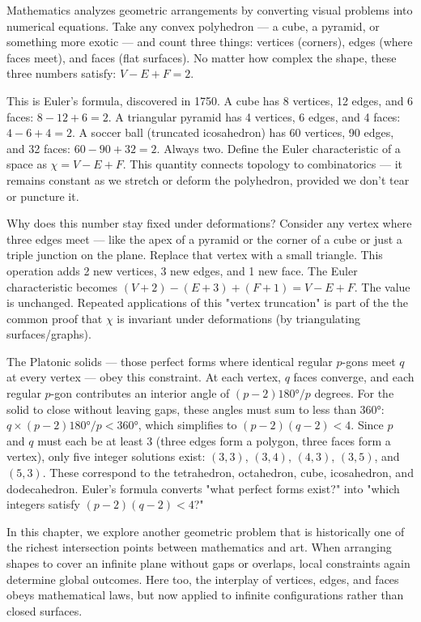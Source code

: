 Mathematics analyzes geometric arrangements by converting visual problems into numerical equations. Take any convex polyhedron — a cube, a pyramid, or something more exotic — and count three things: vertices (corners), edges (where faces meet), and faces (flat surfaces). No matter how complex the shape, these three numbers satisfy: $V - E + F = 2$.

This is Euler's formula, discovered in 1750. A cube has 8 vertices, 12 edges, and 6 faces: $8 - 12 + 6 = 2$. A triangular pyramid has 4 vertices, 6 edges, and 4 faces: $4 - 6 + 4 = 2$. A soccer ball (truncated icosahedron) has 60 vertices, 90 edges, and 32 faces: $60 - 90 + 32 = 2$. Always two. Define the Euler characteristic of a space as $\chi = V - E + F$. This quantity connects topology to combinatorics — it remains constant as we stretch or deform the polyhedron, provided we don't tear or puncture it.

Why does this number stay fixed under deformations? Consider any vertex where three edges meet — like the apex of a pyramid or the corner of a cube or just a triple junction on the plane. Replace that vertex with a small triangle. This operation adds 2 new vertices, 3 new edges, and 1 new face. The Euler characteristic becomes $(V + 2) - (E + 3) + (F + 1) = V - E + F$. The value is unchanged. Repeated applications of this "vertex truncation" is part of the the common proof that $\chi$ is invariant under deformations (by triangulating surfaces/graphs).

The Platonic solids — those perfect forms where identical regular $p$-gons meet $q$ at every vertex — obey this constraint. At each vertex, $q$ faces converge, and each regular $p$-gon contributes an interior angle of $(p-2)180°/p$ degrees. For the solid to close without leaving gaps, these angles must sum to less than $360°$: $q \times (p-2)180°/p < 360°$, which simplifies to $(p-2)(q-2) < 4$. Since $p$ and $q$ must each be at least 3 (three edges form a polygon, three faces form a vertex), only five integer solutions exist: $(3,3)$, $(3,4)$, $(4,3)$, $(3,5)$, and $(5,3)$. These correspond to the tetrahedron, octahedron, cube, icosahedron, and dodecahedron. Euler's formula converts "what perfect forms exist?" into "which integers satisfy $(p-2)(q-2) < 4$?"

In this chapter, we explore another geometric problem that is historically one of the richest intersection points between mathematics and art. When arranging shapes to cover an infinite plane without gaps or overlaps, local constraints again determine global outcomes. Here too, the interplay of vertices, edges, and faces obeys mathematical laws, but now applied to infinite configurations rather than closed surfaces.

